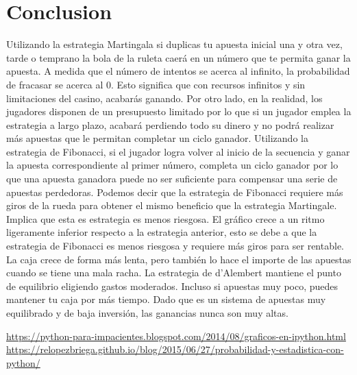 \documentclass[onecolumn]{article}
\begin{document}
\FloatBarrier


\section{Conclusion}
\normalsize Utilizando la estrategia Martingala si duplicas tu apuesta inicial una y otra vez, tarde o temprano la bola de la ruleta caerá en un número que te permita ganar la apuesta.
A medida que el número de intentos se acerca al infinito, la probabilidad de fracasar se acerca al 0. Esto significa que con recursos infinitos y sin limitaciones del casino, acabarás ganando. 
Por otro lado, en la realidad, los jugadores disponen de un presupuesto limitado por lo que si un jugador emplea la estrategia a largo plazo, acabará perdiendo todo su dinero y no podrá realizar más apuestas que le permitan completar un ciclo ganador.
Utilizando la estrategia de Fibonacci, si el jugador logra volver al inicio de la secuencia y ganar la apuesta correspondiente al primer número, completa un ciclo ganador por lo que una apuesta ganadora puede no ser suficiente para compensar una serie de apuestas perdedoras. 
Podemos decir que la estrategia de Fibonacci requiere más giros de la rueda para obtener el mismo beneficio que la estrategia Martingale. Implica que esta es estrategia es menos riesgosa. 
El gráfico crece a un ritmo ligeramente inferior respecto a la estrategia anterior, esto se debe a que la estrategia de Fibonacci es menos riesgosa y requiere más giros para ser rentable. La caja crece de forma más lenta, pero también lo hace el importe de las apuestas cuando se tiene una mala racha.
La estrategia de d'Alembert mantiene el punto de equilibrio eligiendo gastos moderados. Incluso si apuestas muy poco, puedes mantener tu caja por más tiempo. Dado que es un sistema de apuestas muy equilibrado y de baja inversión, las ganancias nunca son muy altas.\\[2ex]

\begin{thebibliography}{99} %

\normalsize \href{https://python-para-impacientes.blogspot.com/2014/08/graficos-en-ipython.html}{https://python-para-impacientes.blogspot.com/2014/08/graficos-en-ipython.html}\\
\normalsize \href{https://relopezbriega.github.io/blog/2015/06/27/probabilidad-y-estadistica-con-python/}{https://relopezbriega.github.io/blog/2015/06/27/probabilidad-y-estadistica-con-python/} \\
\normalsize \href{https://www.casasdeapuestas.com/estrategias-ruleta/} \\
\normalsize \href{https://www.casino.org/es/ruleta/estrategia/} \\
 
\end{thebibliography}

\end{document}
